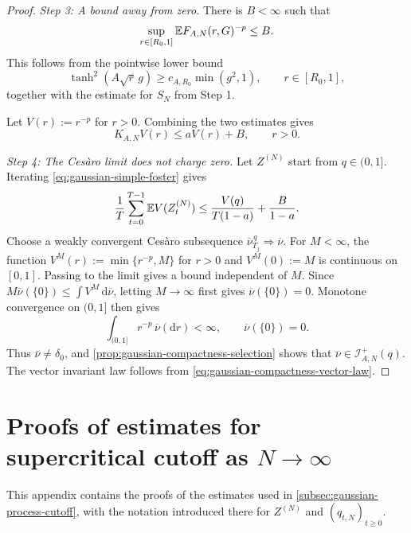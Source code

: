 \documentclass[11pt,reqno,a4paper]{article}
\newcommand{\Ee}{\E}
\begin{document}
\begin{proof}
  \emph{Step 3: A bound away from zero.}
  There is $B<\infty$ such that
  \begin{equation}\label{eq:gaussian-simple-outside-bound}
    \sup_{r\in[R_0,1]}\Ee F_{A,N}(r,G)^{-p}\leq B .
  \end{equation}
  This follows from the pointwise lower bound
  \begin{equation*}
    \tanh^2(A\sqrt r\,g)\geq c_{A,R_0}\min(g^2,1),
    \qquad r\in[R_0,1],
  \end{equation*}
  together with the estimate for $S_N$ from Step 1.

  Let $V(r):=r^{-p}$ for $r>0$. Combining the two estimates gives
  \begin{equation}\label{eq:gaussian-simple-foster}
    K_{A,N}V(r)\leq aV(r)+B,
    \qquad r>0.
  \end{equation}

  \emph{Step 4: The Ces\`aro limit does not charge zero.}
  Let $Z^{(N)}$ start from $q\in(0,1]$. Iterating
  \cref{eq:gaussian-simple-foster} gives
  \begin{equation*}
    \frac1T\sum_{t=0}^{T-1}\Ee V(Z_t^{(N)})
    \leq
    \frac{V(q)}{T(1-a)}+\frac{B}{1-a}.
  \end{equation*}
  Choose a weakly convergent Cesàro subsequence
  $\overline\nu_{T_j}^{\,q}\Rightarrow\overline\nu$. For
  $M<\infty$, the function $V^M(r):=\min\{r^{-p},M\}$ for $r>0$ and
  $V^M(0):=M$ is continuous on $[0,1]$. Passing to the limit gives a bound
  independent of $M$. Since
  $M\overline\nu(\{0\})\leq\int V^M\,\mathrm{d}\overline\nu$, letting
  $M\to\infty$ first gives $\overline\nu(\{0\})=0$. Monotone convergence on
  $(0,1]$ then gives
  \begin{equation*}
    \int_{(0,1]}r^{-p}\,\overline\nu(\mathrm{d}r)<\infty,
    \qquad
    \overline\nu(\{0\})=0.
  \end{equation*}
  Thus $\overline\nu\neq\delta_0$, and
  \cref{prop:gaussian-compactness-selection} shows that
  $\overline\nu\in\mathcal I_{A,N}^+(q)$. The vector invariant law follows
  from \cref{eq:gaussian-compactness-vector-law}.
\end{proof}

\section{Proofs of estimates for supercritical cutoff as
\texorpdfstring{$N\to\infty$}{N tends to infinity}}
\label{app:supercritical-cutoff-estimates}

This appendix contains the proofs of the estimates used in
\cref{subsec:gaussian-process-cutoff}, with the notation introduced there for
$Z^{(N)}$ and $(q_{t,N})_{t\geq0}$.
\end{document}
